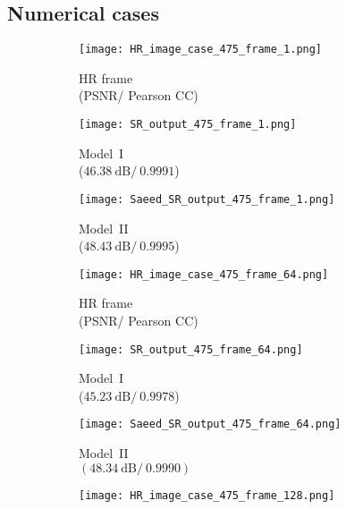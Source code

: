 \subsection{Numerical cases}

\begin{figure} [!h]
	\centering
	\begin{subfigure}[b]{.32\textwidth}
		\centering
		\texttt{[image: HR\_image\_case\_475\_frame\_1.png]}
		\caption{HR frame \\ (PSNR/ Pearson CC)}
		\label{fig:HR_1}
	\end{subfigure}
	\hfill
	\begin{subfigure}[b]{.32\textwidth}
		\centering
		\texttt{[image: SR\_output\_475\_frame\_1.png]}
		\caption{Model~I \\($46.38\ \text{dB}/\ 0.9991$)}
		\label{fig:num_f1_ijjeh}
	\end{subfigure}
	\hfill
	\begin{subfigure}[b]{.32\textwidth}
		\centering
		\texttt{[image: Saeed\_SR\_output\_475\_frame\_1.png]}
		\caption{Model~II \\ ($48.43\ \text{dB}/\ 0.9995$)}
		\label{fig:num_f1_saeed}	
	\end{subfigure}
	\hfill
	\begin{subfigure}[b]{.32\textwidth}
		\centering
		\texttt{[image: HR\_image\_case\_475\_frame\_64.png]}
		\caption{HR frame \\ (PSNR/ Pearson CC)}
		\label{fig:HR_2}
	\end{subfigure}
	\hfill
	\begin{subfigure}[b]{.32\textwidth}
		\centering
		\texttt{[image: SR\_output\_475\_frame\_64.png]}
		\caption{Model~I \\ ($45.23\ \text{dB}/\ 0.9978$)}
		\label{fig:num_f64_ijjeh}
	\end{subfigure}
	\hfill
	\begin{subfigure}[b]{.32\textwidth}
		\centering
		\texttt{[image: Saeed\_SR\_output\_475\_frame\_64.png]}
		\caption{Model~II \\ $(48.34\ \text{dB}/\ 0.9990)$}
		\label{fig:num_f64_saeed}	
	\end{subfigure}
	\hfill
	\begin{subfigure}[b]{.32\textwidth}
		\centering
		\texttt{[image: HR\_image\_case\_475\_frame\_128.png]}

\end{subfigure}
\end{figure}
